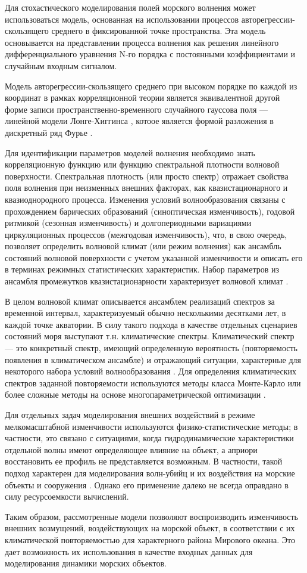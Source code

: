 Для стохастического моделирования полей морского волнения может использоваться модель, основанная на использовании процессов авторегрессии-скользящего среднего \citep{p295I_31} в фиксированной точке пространства. Эта модель основывается на представлении процесса волнения как решения линейного дифференциального уравнения N-го порядка с постоянными коэффициентами и случайным входным сигналом.

Модель авторегрессии-скользящего среднего при высоком порядке по каждой из координат в рамках корреляционной теории является эквивалентной другой форме записи пространственно-временного случайного гауссова поля --- линейной модели Лонге-Хиггинса \citep{p295I_45}, котоое является формой разложения в дискретный ряд Фурье \citep{krogstad89}.

Для идентификации параметров моделей волнения необходимо знать корреляционную функцию или функцию спектральной плотности волновой поверхности. Спектральная плотность (или просто спектр) отражает свойства поля волнения при неизменных внешних факторах, как квазистационарного и квазиоднородного процесса. Изменения условий волнообразования связаны с прохождением барических образований (синоптическая изменчивость), годовой ритмикой (сезонная изменчивость) и долгопериодными вариациями циркуляционных процессов (межгодовая изменчивость), что, в свою очередь, позволяет определить волновой климат (или режим волнения) как ансамбль состояний волновой поверхности с учетом указанной изменчивости и описать его в терминах режимных статистических характеристик. Набор параметров из ансамбля промежутков квазистационарности характеризует волновой климат \citep{dk4}.

В целом волновой климат описывается ансамблем реализаций спектров за временной интервал, характеризуемый обычно несколькими десятками лет, в каждой точке  акватории. В силу такого подхода в качестве отдельных сценариев состояний моря выступают т.н. климатические спектры. Климатический спектр — это конкретный спектр, имеющий определенную вероятность (повторяемость появления в климатическом ансамбле) и отражающий ситуации, характерные для некоторого набора условий волнообразования \citep{dk4}. Для определения климатических спектров заданной повторяемости используются методы класса Монте-Карло \citep{dk8} или более сложные методы на основе многопараметрической оптимизации  \citep{dk5}.

Для отдельных задач моделирования внешних воздействий в режиме мелкомасштабной изменчивости используются физико-статистические методы; в частности, это связано с ситуациями, когда гидродинамические характеристики отдельной волны имеют определяющее влияние на объект, а априори восстановить ее профиль не представляется возможным. В частности, такой подход характерен для моделирования волн-убийц и их воздействия на морские объекты и сооружения \citep{dk12}\citep{dk13}. Однако его применение далеко не всегда оправдано в силу ресурсоемкости вычислений.

Таким образом, рассмотренные модели позволяют воспроизводить изменчивость внешних возмущений, воздействующих на морской объект, в соответствии с их климатической повторяемостью для характерного района Мирового океана. Это дает возможность их использования в качестве входных данных для моделирования динамики морских объектов.